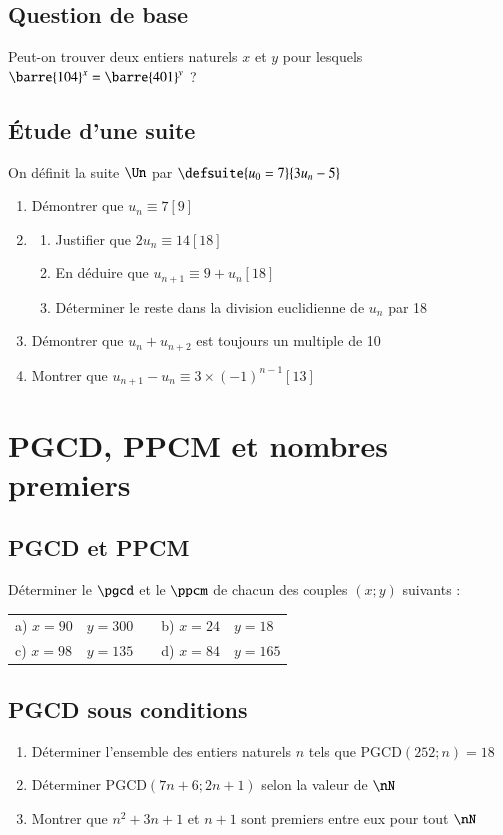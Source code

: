\documentclass[oneside,12pt]{article}          %
\begin{document}
\subsection{Question de base}

Peut-on trouver deux entiers naturels $x$ et $y$ pour lesquels $\barre{104}^x=\barre{401}^y$ ?



\subsection{Étude d'une suite}
On définit la suite $\Un$ par $\defsuite{u_0=7}{3u_n-5}$
\begin{enumerate}
	\item Démontrer que $u_n\equiv7[9]$
	\item\begin{enumerate}
		\item Justifier que $2u_n\equiv14[18]$
		\item En déduire que $u_{n+1}\equiv9+u_n[18]$
		\item Déterminer le reste dans la division euclidienne de $u_n$ par 18
	\end{enumerate}
	\item Démontrer que $u_n+u_{n+2}$ est toujours un multiple de 10
	\item Montrer que $u_{n+1}-u_n\equiv3\times(-1)^{n-1}[13]$
\end{enumerate}



\section{PGCD, PPCM et nombres premiers}

\subsection{PGCD et PPCM}
Déterminer le $\pgcd$ et le $\ppcm$ de chacun des couples $(x;y)$ suivants :

\begin{tabular}{p{20mm}p{35mm}|p{15mm}p{30mm}p{30mm}}
     a) $x=90$ & $y=300$ & & b) $x=24$ & $y=18$ \\
     c) $x=98$ & $y=135$ & & d) $x=84$ & $y=165$
\end{tabular}



\subsection{PGCD sous conditions}
\begin{enumerate}
    \item Déterminer l'ensemble des entiers naturels $n$ tels que $\mathrm{PGCD}(252;n)=18$
    \item Déterminer $\mathrm{PGCD}(7n+6;2n+1)$ selon la valeur de $\nN$
    \item Montrer que $n^2+3n+1$ et $n+1$ sont premiers entre eux pour tout $\nN$
\end{enumerate}
\end{document}
